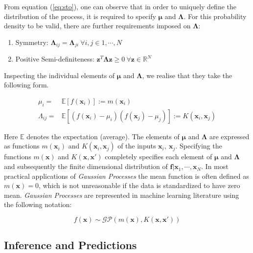 From equation (\ref{eq:sto}), one can observe that in order to uniquely define the distribution of the process, it is required to specify $\mathbf{\mu}$ and $\mathbf{\Lambda}$. For this probability density to be valid, there are further requirements imposed on $\mathbf{\Lambda}$: 


\begin{enumerate}
      \item Symmetry: $\mathbf{\Lambda}_{ij} = \mathbf{\Lambda}_{ji} \ \forall i,j \in {1, \cdots, N} $ 
      \item Positive Semi-definiteness: $\mathbf{z}^T \mathbf{\Lambda} \mathbf{z} \geq 0 \ \forall \mathbf{z} \in \mathbb{R}^N$  
\end{enumerate}

Inspecting the individual elements of $\mathbf{\mu}$ and $\mathbf{\Lambda}$, we realise that they take the following form.

\begin{align}
      \mu_i = & \mathbb{E}[f(\mathbf{x}_i)] := m(\mathbf{x}_i) \\
      \Lambda_{ij} = & \mathbb{E}[(f(\mathbf{x}_i) - \mu_i)(f(\mathbf{x}_j) - \mu_j)] := K(\mathbf{x}_i, \mathbf{x}_j)
\end{align}

Here $\mathbb{E}$ denotes the expectation (average). The elements of $\mathbf{\mu}$ and $\mathbf{\Lambda}$ are expressed as functions $m(\mathbf{x}_i)$ and $K(\mathbf{x}_i, \mathbf{x}_j)$ of the inputs $\mathbf{x}_i,\ \mathbf{x}_j$. Specifying the functions $m(\mathbf{x})$ and $K(\mathbf{x}, \mathbf{x}')$ completely specifies each element of $\mathbf{\mu}$ and $\mathbf{\Lambda}$ and subsequently the finite dimensional distribution of $\mathbf{f} | \mathbf{x}_1, \cdots, \mathbf{x}_N $. In most practical applications of \emph{Gaussian Processes} the mean function is often defined as $m(\mathbf{x}) = 0$, which is not unreasonable if the data is standardized to have zero mean. \emph{Gaussian Processes} are represented in machine learning literature using the following notation:

\begin{equation}\label{eq:gpformulation}
    f(\mathbf{x}) \sim \mathcal{GP}(m(\mathbf{x}), K(\mathbf{x}, \mathbf{x}'))
\end{equation}

\subsection{Inference and Predictions} \label{sec:inference}

